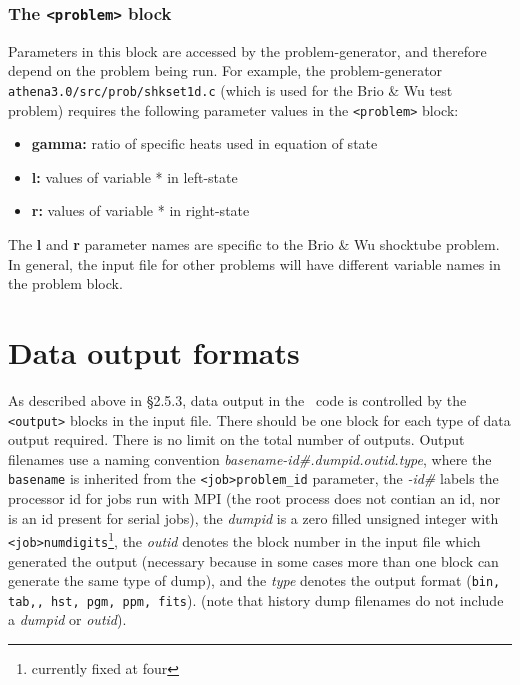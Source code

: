 \subsubsection{The {\tt <problem>} block}

Parameters in this block are accessed by the problem-generator,
and therefore depend on the problem being run.  For example, the 
problem-generator {\tt athena3.0/src/prob/shkset1d.c}
(which is used for the Brio \& Wu test problem)
requires the following parameter values in the {\tt <problem>} block:
\begin{itemize}
\item {\bf gamma:} ratio of specific heats used in equation of state
\item {\bf *l:} values of variable * in left-state
\item {\bf *r:} values of variable * in right-state
\end{itemize}
The {\bf *l} and {\bf *r} parameter names are specific to the Brio \&
Wu shocktube problem.  In general, the input file for other problems
will have different variable names in the problem block.

\section{Data output formats}

As described above in \S 2.5.3, data output in the \ath\ code is
controlled by the {\tt <output>} blocks in the input file.  There should
be one block for each type of data output required.  There is no limit on
the total number of outputs.  Output filenames use a naming convention
{\it basename-id\#.dumpid.outid.type}, where the {\tt basename} is inherited
from the {\tt <job>problem\_id} parameter, the {\it -id\#} labels the
processor id for jobs run with MPI (the root process does not contian an
id, nor is an id present for serial jobs), the {\it dumpid} is a zero
filled unsigned integer with {\tt <job>numdigits}\footnote{currently
fixed at four}, the {\it outid} denotes the block number in the input
file which generated the output (necessary because in some cases more
than one block can generate the same type of dump), and the {\it type}
denotes the output format ({\tt bin, tab,, hst, pgm, ppm, fits}).
(note that history dump filenames do not include a {\it dumpid} or
{\it outid}). 

